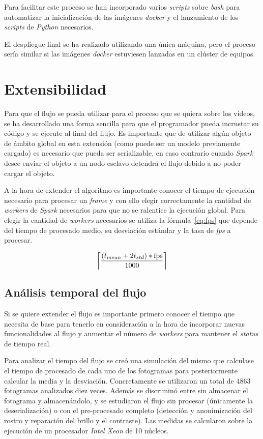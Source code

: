Para facilitar este proceso se han incorporado varios \textit{scripts} sobre \textit{bash} para automatizar la inicialización de las imágenes \textit{docker} y el lanzamiento de los \textit{scripts} de \textit{Python} necesarios.

El despliegue final se ha realizado utilizando una única máquina, pero el proceso sería similar si las imágenes \textit{docker} estuviesen lanzadas en un clúster de equipos.
  

\section{Extensibilidad}

Para que el flujo se pueda utilizar para el proceso que se quiera sobre los vídeos, se ha desarrollado una forma sencilla para que el programador pueda incrustar su código y se ejecute al final del flujo. Es importante que de utilizar algún objeto de ámbito global en esta extensión (como puede ser un modelo previamente cargado) es necesario que pueda ser serializable, en caso contrario cuando \textit{Spark} desee enviar el objeto a un nodo esclavo detendrá el flujo debido a no poder cargar el objeto.

A la hora de extender el algoritmo es importante conocer el tiempo de ejecución necesario para procesar un \textit{frame} y con ello elegir correctamente la cantidad de \textit{workers} de \textit{Spark} necesarios para que no se ralentice la ejecución global. Para elegir la cantidad de \textit{workers} necesarios se utiliza la fórmula~\ref{eq:fps} que depende del tiempo de procesado medio, su desviación estándar y la tasa de \textit{fps} a procesar.

\begin{equation}\label{eq:fps}
\left \lceil \frac{(t_{mean}+2t_{std})*\textrm{fps}}{1000} \right \rceil
\end{equation}

\subsection{Análisis temporal del flujo}\label{sec:analisistemporal_flujo}

Si se quiere extender el flujo es importante primero conocer el tiempo que necesita de base para tenerlo en consideración a la hora de incorporar nuevas funcionalidades al flujo y aumentar el número de \textit{workers} para mantener el \textit{status} de tiempo real.

Para analizar el tiempo del flujo se creó una simulación del mismo que calculase el tiempo de procesado de cada uno de los fotogramas para posteriormente calcular la media y la desviación. Concretamente se utilizaron un total de $4863$ fotogramas analizados diez veces. Además se discriminó entre sin almacenar el fotograma y almacenándolo, y se estudiaron el flujo sin procesar (únicamente la deserialización) o con el pre-procesado completo (detección y anonimización del rostro y reparación del brillo y el contraste). Las medidas se calcularon sobre la ejecución de un procesador \textit{Intel Xeon} de 10 núcleos.

